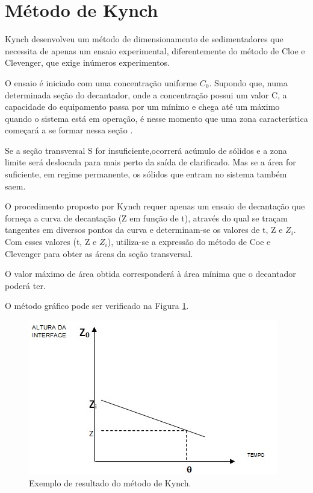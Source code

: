 \section{Método de Kynch}

Kynch desenvolveu um método de dimensionamento de sedimentadores que necessita de apenas um ensaio experimental, diferentemente do método de Cloe e Clevenger, que exige inúmeros experimentos. 

O ensaio é iniciado com uma concentração uniforme $ C_{0} $. Supondo que, numa determinada seção do decantador, onde a concentração possui um valor C, a capacidade do equipamento passa por um mínimo e chega até um máximo quando o sistema está em operação, é nesse momento que uma zona característica começará a se formar nessa seção \citep{foust}. 

Se a seção transversal S for insuficiente,ocorrerá acúmulo de sólidos e a zona limite será deslocada para mais perto da saída de clarificado. Mas se a área for suficiente, em regime permanente, os sólidos que entram no sistema também saem.


O procedimento proposto por Kynch requer apenas um ensaio de decantação que forneça a curva de decantação (Z em função de t), através do qual se traçam tangentes em diversos pontos da curva e determinam-se os valores de t, Z e $ Z_{i} $. Com esses valores (t, Z e $ Z_{i} $), utiliza-se a expressão do método de Coe e Clevenger para obter as áreas da seção transversal.

O valor máximo de área obtida corresponderá à área mínima que o decantador poderá ter.

O método gráfico pode ser verificado na Figura \ref{met}.

\begin{figure}[H]
	\begin{center}
		\includegraphics[scale=.5,trim={0 0 0 0}]{figuras/ladeq/sedi/graphKynch}
		\caption{Exemplo de resultado do método de Kynch.}
		\label{met}
	\end{center}
\end{figure}


